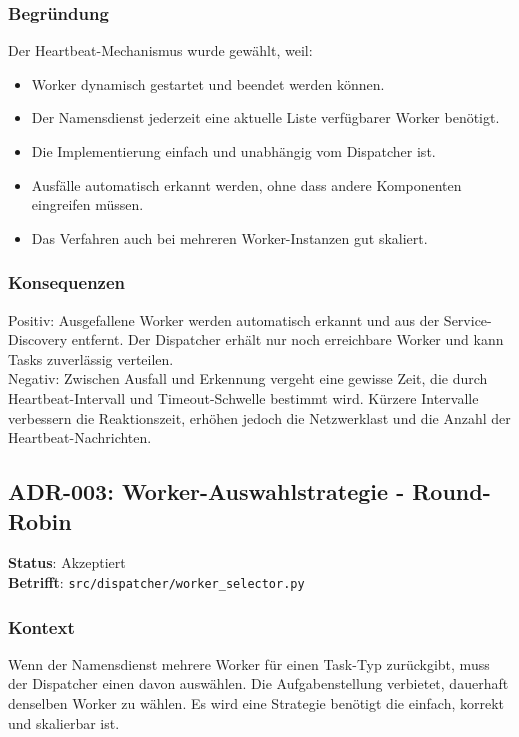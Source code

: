 \subsubsection*{Begründung}

Der Heartbeat-Mechanismus wurde gewählt, weil:

\begin{itemize}
	\item Worker dynamisch gestartet und beendet werden können.
	\item Der Namensdienst jederzeit eine aktuelle Liste verfügbarer Worker benötigt.
	\item Die Implementierung einfach und unabhängig vom Dispatcher ist.
	\item Ausfälle automatisch erkannt werden, ohne dass andere Komponenten eingreifen müssen.
	\item Das Verfahren auch bei mehreren Worker-Instanzen gut skaliert.
\end{itemize}

\subsubsection*{Konsequenzen}

Positiv: Ausgefallene Worker werden automatisch erkannt und aus der
Service-Discovery entfernt. Der Dispatcher erhält nur noch erreichbare
Worker und kann Tasks zuverlässig verteilen.
\\
Negativ: Zwischen Ausfall und Erkennung vergeht eine gewisse Zeit,
die durch Heartbeat-Intervall und Timeout-Schwelle bestimmt wird.
Kürzere Intervalle verbessern die Reaktionszeit, erhöhen jedoch die
Netzwerklast und die Anzahl der Heartbeat-Nachrichten.


\subsection{ADR-003: Worker-Auswahlstrategie - Round-Robin}

\textbf{Status}: Akzeptiert \\
\textbf{Betrifft}: \texttt{src/dispatcher/worker\_selector.py}

\subsubsection*{Kontext}

Wenn der Namensdienst mehrere Worker für einen Task-Typ zurückgibt,
muss der Dispatcher einen davon auswählen.
Die Aufgabenstellung verbietet, dauerhaft denselben Worker zu wählen.
Es wird eine Strategie benötigt die einfach, korrekt und skalierbar ist.

